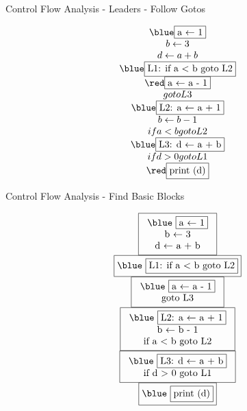 \documentclass[mcgill,slideColor,colorBG,pdf]{prosper}
\begin{document}
\begin{slide} {Control Flow Analysis - Leaders - Follow Gotos}
\begin{tiny}
$$
\begin{array}{c}
{\blue \fbox{a $\leftarrow$ 1}}\\
b \leftarrow 3\\
d \leftarrow a + b\\
{\blue \fbox{L1: if a < b goto L2}}\\
{\red \fbox{a $\leftarrow$ a - 1}}\\
goto L3\\
{\blue \fbox{L2: a $\leftarrow$ a + 1}}\\
b \leftarrow b - 1\\
if a < b goto L2\\
{\blue \fbox{L3: d $\leftarrow$ a + b}}\\
if d > 0 goto L1\\
{\red \fbox{print (d)}}
\end{array}
$$
\end{tiny}
\end{slide}

\begin{slide} {Control Flow Analysis - Find Basic Blocks}
\begin{tiny}
$$
\begin{array}{c}
\fbox{\begin{tabular}{c}{\blue \fbox{a $\leftarrow$ 1}}\\
b $\leftarrow$ 3\\
d $\leftarrow$ a + b \end{tabular}}\\
\fbox{{\blue \fbox{L1: if a < b goto L2}}}\\
\fbox{\begin{tabular}{c}{\blue \fbox{a $\leftarrow$ a - 1}}\\
goto L3 \end{tabular}}\\
\fbox{\begin{tabular}{c}{\blue \fbox{L2: a $\leftarrow$ a + 1}}\\
b $\leftarrow$ b - 1\\
if a < b goto L2 \end{tabular}}\\
\fbox{\begin{tabular}{c}{\blue \fbox{L3: d $\leftarrow$ a + b}}\\
if d > 0 goto L1\end{tabular}}\\
\fbox{{\blue \fbox{print (d)}}}
\end{array}
$$
\end{tiny}
\end{slide}
\end{document}
